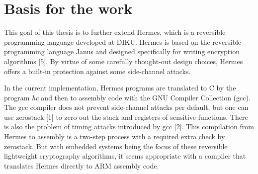 \section{Basis for the work}
This goal of this thesis is to further extend Hermes, which is a reversible programming language developed at DIKU.
Hermes is based on the reversible programming language Janus and designed specifically for writing encryption algorithms [5].
By virtue of some carefully thought-out design choices, Hermes offers a built-in protection against some side-channel attacks.

In the current implementation, Hermes programs are translated to C by the program \emph{hc} and then to assembly code with the GNU Compiler Collection (gcc). The gcc compiler does not prevent side-channel attacks per default, but one can use zerostack [1] to zero out the stack and registers of sensitive functions.
There is also the problem of timing attacks introduced by gcc [2].
This compilation from Hermes to assembly is a two-step process with a required extra check by zerostack. But with embedded systems being the focus of these reversible lightweight cryptography algorithms, it seems appropriate with a compiler that translates Hermes directly to ARM assembly code.


%
%
%
%

